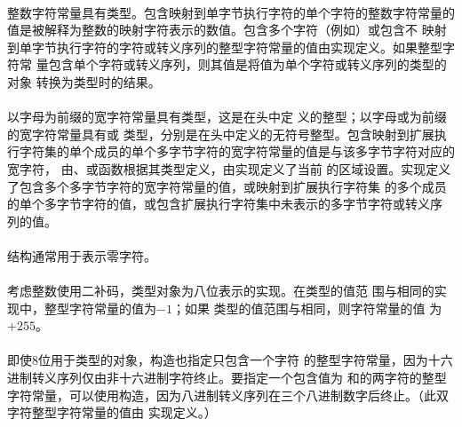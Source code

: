 \semantic
\paragraph{}
整数字符常量具有类型。包含映射到单字节执行字符的单个字符的整数字符常量的
值是被解释为整数的映射字符表示的数值。包含多个字符（例如）或包含不
映射到单字节执行字符的字符或转义序列的整型字符常量的值由实现定义。如果整型字符常
量包含单个字符或转义序列，则其值是将值为单个字符或转义序列的类型的对象
转换为类型时的结果。

\paragraph{}
以字母为前缀的宽字符常量具有类型，这是在头中定
义的整型；以字母或为前缀的宽字符常量具有或
类型，分别是在头中定义的无符号整型。包含映射到扩展执
行字符集的单个成员的单个多字节字符的宽字符常量的值是与该多字节字符对应的宽字符，
由、或函数根据其类型定义，由实现定义了当前
的区域设置。实现定义了包含多个多字节字符的宽字符常量的值，或映射到扩展执行字符集
的多个成员的单个多字节字符的值，或包含扩展执行字符集中未表示的多字节字符或转义序
列的值。

\paragraph{}
\ex 结构\tm{\sq\bs 0\sq}通常用于表示零字符。

\paragraph{}
\ex 考虑整数使用二补码，类型对象为八位表示的实现。在类型的值范
围与相同的实现中，整型字符常量的值为$-1$；如果
类型的值范围与相同，则字符常量的值
为$+255$。

\paragraph{}
\ex 即使8位用于类型的对象，构造也指定只包含一个字符
的整型字符常量，因为十六进制转义序列仅由非十六进制字符终止。要指定一个包含值为
和的两字符的整型字符常量，可以使用构造\tm{\sq\b
0223\sq}，因为八进制转义序列在三个八进制数字后终止。（此双字符整型字符常量的值由
实现定义。）

